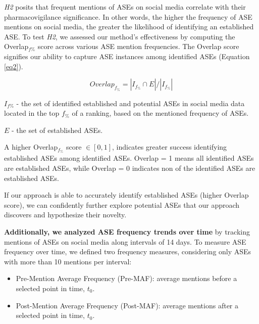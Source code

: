 \documentclass[referee,bst/sn-basic]{sn-jnl}%
\theoremstyle{thmstyletwo}%
\theoremstyle{thmstylethree}%
\begin{document}
\textit{H2} posits that frequent mentions of ASEs on social media correlate with their  pharmacovigilance significance. 
In other words, the higher the frequency of ASE mentions on social media, the greater the likelihood of identifying an established ASE. 
To test \textit{H2}, we assessed our method’s effectiveness by computing the Overlap$_{f\%}$ score across various ASE mention frequencies.
The Overlap score signifies our ability to capture ASE instances among identified ASEs (Equation \ref{eq2}).

\begin{equation}
\label{eq2}
Overlap_{f_\%}=|I_{f_\%} \cap E |/|I_{f_\%}|
\end{equation}

$I_{f\%}$ - the set of identified established and potential ASEs in social media data located in the top $f_\%$ of a ranking, based on the mentioned frequency of ASEs.

$E$ - the set of established ASEs.

A higher Overlap$_{f_\%}$ score $\in [0,1]$, indicates greater success identifying established ASEs among identified ASEs. 
Overlap = 1 means all identified ASEs are established ASEs, while Overlap = 0 indicates non of the identified ASEs are established ASEs.

If our approach is able to accurately identify established ASEs (higher Overlap score), we can confidently further explore potential ASEs that our approach discovers and hypothesize their novelty.

\textbf{Additionally, we analyzed ASE frequency trends over time}
by tracking mentions of ASEs on social media along intervals of 14 days.
To measure ASE frequency over time, we defined two frequency measures, considering only ASEs with more than 10 mentions per interval:

\begin{itemize}
\item
    Pre-Mention Average Frequency (Pre-MAF): average mentions before a selected point in time, $t_0$. 
\item 
    Post-Mention Average Frequency (Post-MAF): average mentions after a selected point in time, $t_0$.
\end{itemize}
\end{document}
